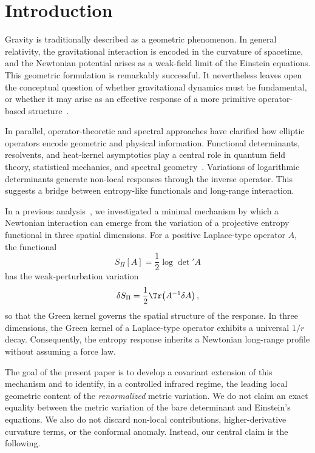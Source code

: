 \section{Introduction}
  \label{sec:introduction}

  Gravity is traditionally described as a geometric phenomenon.
  In general relativity, the gravitational interaction is encoded in the curvature of spacetime, and the Newtonian
  potential arises as a weak-field limit of the Einstein equations.
  This geometric formulation is remarkably successful.
  It nevertheless leaves open the conceptual question of whether gravitational dynamics must be fundamental, or
  whether it may arise as an effective response of a more primitive operator-based structure~\cite{Cosmochrony}.

  In parallel, operator-theoretic and spectral approaches have clarified how elliptic operators encode geometric and
  physical information.
  Functional determinants, resolvents, and heat-kernel asymptotics play a central role in quantum field theory,
  statistical mechanics, and spectral geometry~\cite{Vassilevich2003,ParkerToms2009}.
  Variations of logarithmic determinants generate non-local responses through the inverse operator.
  This suggests a bridge between entropy-like functionals and long-range interaction.

  In a previous analysis~\cite{Beau2026a}, we investigated a minimal mechanism by which a Newtonian interaction
  can emerge from the
  variation of a projective entropy functional in three spatial dimensions.
  For a positive Laplace-type operator \(A\), the functional
  \begin{equation}
    S_\Pi[A] = \frac12 \log \det\nolimits' A
  \end{equation}
  has the weak-perturbation variation
  \begin{equation}
    \delta S_\Pi = \frac12 \Tr\!\left(A^{-1}\delta A\right),
  \end{equation}
  so that the Green kernel governs the spatial structure of the response.
  In three dimensions, the Green kernel of a Laplace-type operator exhibits a universal \(1/r\) decay.
  Consequently, the entropy response inherits a Newtonian long-range profile without assuming a force law.

  The goal of the present paper is to develop a covariant extension of this mechanism and to identify, in a controlled
  infrared regime, the leading local geometric content of the \emph{renormalized} metric variation.
  We do not claim an exact equality between the metric variation of the bare determinant and Einstein's equations.
  We also do not discard non-local contributions, higher-derivative curvature terms, or the conformal anomaly.
  Instead, our central claim is the following.

